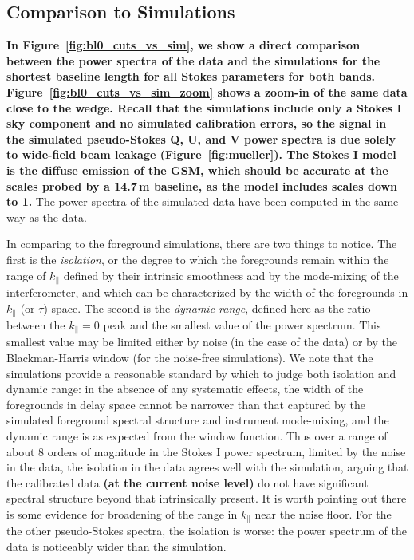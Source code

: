 \documentclass[twocolumn, trackchanges]{aastex61}
\newcommand{\edited}[1]{{\bf \color{blue} #1}}
\begin{document}
\subsection{Comparison to Simulations}

\edited{In Figure~\ref{fig:bl0_cuts_vs_sim}, we show a direct comparison between
  the power spectra of the data and the simulations for the shortest baseline
  length for all Stokes parameters for both
  bands. Figure~\ref{fig:bl0_cuts_vs_sim_zoom} shows a zoom-in of the same data
  close to the wedge. Recall that the simulations include only a Stokes I sky
  component and no simulated calibration errors, so the signal in the simulated
  pseudo-Stokes Q, U, and V power spectra is due solely to wide-field beam
  leakage (Figure~\ref{fig:mueller}). The Stokes I model is the diffuse emission of the GSM, which should be accurate at the scales probed by a 14.7\,m baseline, as the model includes scales down to 1\arcdeg.} 
 The power spectra of the simulated data have been computed in the same way as the data.

In comparing to the foreground simulations, there are two things to notice.  The
first is the {\it isolation}, or the degree to which the foregrounds remain
within the range of $k_\parallel$ defined by their intrinsic smoothness and by
the mode-mixing of the interferometer, and which can be characterized by the
width of the foregrounds in $k_\parallel$ (or $\tau$) space.  The second is the
{\it dynamic range}, defined here as the ratio between the $k_\parallel=0$ peak
and the smallest value of the power spectrum.  This smallest value may be limited
either by noise (in the case of the data) or by the Blackman-Harris window (for
the noise-free simulations).  We note that the simulations provide a reasonable
standard by which to judge both isolation and dynamic range: in the absence of
any systematic effects, the width of the foregrounds in delay space cannot be
narrower than that captured by the simulated foreground spectral structure and
instrument mode-mixing, and the dynamic range is as expected from the window
function.  Thus over a range of about 8 orders of magnitude in the Stokes I
power spectrum, limited by the noise in the data, the isolation in the data
agrees well with the simulation, arguing that the calibrated data \edited{(at
  the current noise level)} do not have significant spectral structure beyond
that intrinsically present.  It is worth pointing out there is some evidence for
broadening of the range in $k_\parallel$ near the noise floor.  For the the other
pseudo-Stokes spectra, the isolation is worse: the power spectrum of the data is
noticeably wider than the simulation.
\end{document}
